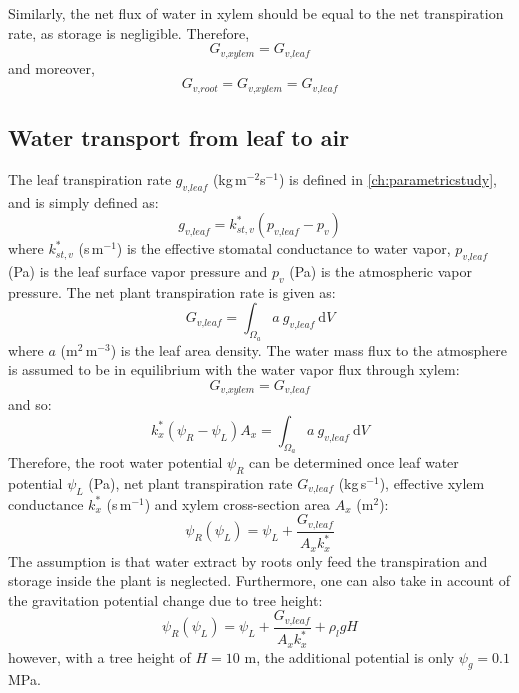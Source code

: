 Similarly, the net flux of water in xylem should be equal to the net transpiration rate, as storage is negligible. Therefore, 
\begin{equation}
G_{\textit{v,xylem}} = G_{\textit{v,leaf}}
\end{equation}
and moreover,
\begin{equation}
G_{\textit{v,root}}  = G_{\textit{v,xylem}} = G_{\textit{v,leaf}}
\end{equation}

\subsection{Water transport from leaf to air}

The leaf transpiration rate $g_{\textit{v,leaf}}$ (kg\,m$^{-2}$s$^{-1}$) is defined in \cref{ch:parametricstudy}, and is simply defined as:
\begin{equation}
g_{\textit{v,leaf}} = k_{st,v}^* \left(p_{\textit{v,leaf}} - p_v\right)
\end{equation}
where $k_{st,v}^*$ (s\,m$^{-1}$) is the effective stomatal conductance to water vapor, $p_{\textit{v,leaf}}$ (Pa) is the leaf surface vapor pressure and $p_v$ (Pa) is the atmospheric vapor pressure. The net plant transpiration rate is given as:
\begin{equation}
G_{\textit{v,leaf}} = \int_{\Omega_a} a~g_{\textit{v,leaf}}~\mathrm{d}V
\end{equation}
where $a$ (m$^2$\,m$^{-3}$) is the leaf area density. The water mass flux to the atmosphere is assumed to be in equilibrium with the water vapor flux through xylem:
\begin{equation}
G_{\textit{v,xylem}}  = G_{\textit{v,leaf}} 
\end{equation}
and so:
\begin{equation}
k_x^* \left( \psi_R - \psi_L \right) A_x = \int_{\Omega_a} a~g_{\textit{v,leaf}}~\mathrm{d} V
\end{equation}
Therefore, the root water potential $\psi_R$ can be determined once leaf water potential $\psi_L$ (Pa), net plant transpiration rate $G_{\textit{v,leaf}}$ (kg\,s$^{-1}$), effective xylem conductance $k_x^*$ (s\,m$^{-1}$) and xylem cross-section area $A_x$ (m$^2$):
\begin{equation}
\psi_R \left(\psi_L\right) = \psi_L  + \frac{G_{\textit{v,leaf}}}{A_x k_x^*}
\end{equation}
The assumption is that water extract by roots only feed the transpiration and storage inside the plant is neglected. Furthermore, one can also take in account of the gravitation potential change due to tree height:
\begin{equation}
\psi_R \left(\psi_L\right) = \psi_L  + \frac{G_{\textit{v,leaf}}}{A_x k_x^*} + \rho_l g H
\end{equation}
however, with a tree height of $H = 10$ m, the additional potential is only $\psi_g = 0.1$ MPa.


